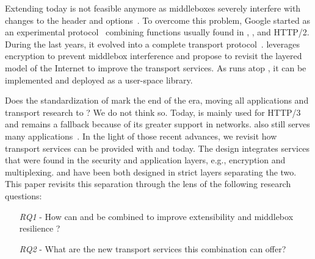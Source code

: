 Extending \tcp today is not feasible anymore as middleboxes severely interfere
with changes to the \tcp header and
options~\cite{medina2004measuring,honda2011still,edeline2019bottom}.
To overcome this problem, Google started \quic as an experimental
protocol~\cite{roskind2013quic,langley2017quic} combining functions usually
found in \tcp, \tls, and HTTP/2. During the last years, it
evolved into a complete transport protocol~\cite{rfc9000}.
\quic leverages encryption to prevent middlebox interference and propose to
revisit the layered model of the Internet to improve the transport services.
As \quic runs atop \udp, it can be implemented and deployed as a user-space library.

Does the standardization of \quic mark the end of the \tcp era, moving
all applications and transport research to \quic?  We do not think
so. Today, \quic is mainly used for HTTP/3~\cite{http3} and \tcp remains a
fallback because of its greater support in networks. \tcp also still serves many  applications~\cite{covid19,fiveyears}.
%
In the light of those recent advances, we revisit how transport services can be
provided with \tcp and \tls today. The \quic design integrates services
that were found in the security and application layers, e.g., encryption and multiplexing.
\tcp and \tls have been both designed in strict layers separating the two.
This paper revisits this separation through the lens of the following research questions:

\begin{itemize}
	\item[{\small{\textit{RQ1}}} -] How can \tcp and \tls be
	combined to improve extensibility and middlebox resilience ?
	\item[{\small{\textit{RQ2}}} -] What are the new transport services this
	combination can offer?
\end{itemize}

